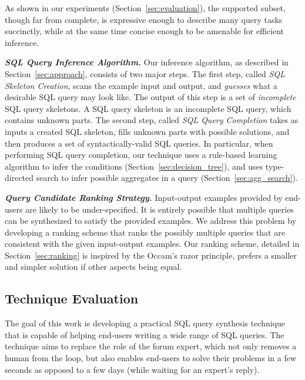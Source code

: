 As shown in our experiments (Section~\ref{sec:evaluation}), the supported subset, though far from complete, is expressive
enough to describe many query tasks succinctly, while at the same time concise
enough to be amenable for efficient inference. 



\vspace{1mm}
\noindent \textbf{\textit{SQL Query Inference Algorithm.}} Our inference
algorithm, as described in Section~\ref{sec:approach}, consists of two
major steps. The first step, called \textit{SQL Skeleton Creation}, scans
the example input and output, and \textit{guesses} what a desirable
SQL query may look like. The output of this step is a set of \textit{incomplete} SQL
query skeletons. A SQL query skeleton is an incomplete SQL query,
which contains unknown parts. The second step,
called \textit{SQL Query Completion} takes as inputs a created
SQL skeleton, fills unknown parts with possible solutions, and then produces a set of
syntactically-valid SQL queries. In particular, when performing
SQL query completion, our technique uses a rule-based learning algorithm
to infer the conditions (Section~\ref{sec:decision_tree}), and uses 
type-directed search to infer possible aggregates in a query (Section~\ref{sec:agg_search}).

\vspace{1mm}
\noindent \textbf{\textit{Query Candidate Ranking Strategy.}}
Input-output examples provided by end-users are likely to
be under-specified. It is entirely possible that multiple
queries can be synthesized to satisfy the provided examples.
We address this problem by developing a ranking scheme that 
ranks the possibly multiple queries
that are consistent with the given input-output
examples. Our ranking scheme, detailed in Section~\ref{sec:ranking}
is inspired by the Occam's razor principle, prefers a smaller and
simpler solution if other aspects being equal.




\subsection{Technique Evaluation}

The goal of this work is developing a practical SQL query synthesis technique that is capable of
helping end-users writing a wide range of SQL queries.
The technique aims to replace the role of the forum expert,
which not only removes a human from the loop, but also enables
end-users to solve their problems in a few seconds as opposed to a few days
(while waiting for an expert's reply). 

